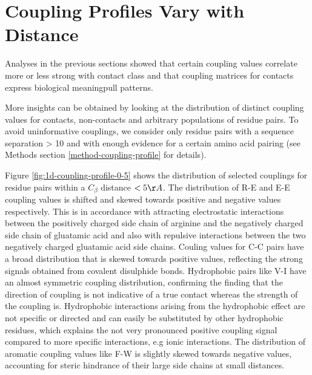 \documentclass[12pt,a4paper,twoside]{book}
\newcommand{\Cb}{C_\beta}
\theoremstyle{definition}
\theoremstyle{definition}
\theoremstyle{remark}
\begin{document}
\section{Coupling Profiles Vary with
Distance}\label{coupling-profiles-vary-with-distance}

Analyses in the previous sections showed that certain coupling values
correlate more or less strong with contact class and that coupling
matrices for contacts express biological meaningpull patterns.

More insights can be obtained by looking at the distribution of distinct
coupling values for contacts, non-contacts and arbitrary populations of
residue pairs. To avoid uninformative couplings, we consider only
residue pairs with a sequence separation \textgreater{} 10 and with
enough evidence for a certain amino acid pairing (see Methods section
\ref{method-coupling-profile} for details).

Figure \ref{fig:1d-coupling-profile-0-5} shows the distribution of
selected couplings for residue pairs within a \(\Cb\) distance
\(< 5\AA\). The distribution of R-E and E-E coupling values is shifted
and skewed towards positive and negative values respectively. This is in
accordance with attracting electrostatic interactions between the
positively charged side chain of arginine and the negatively charged
side chain of gluatamic acid and also with repulsive interactions
between the two negatively charged gluatamic acid side chains. Couling
values for C-C pairs have a broad distribution that is skewed towards
positive values, reflecting the strong signals obtained from covalent
disulphide bonds. Hydrophobic pairs like V-I have an almost symmetric
coupling distribution, confirming the finding that the direction of
coupling is not indicative of a true contact whereas the strength of the
coupling is. Hydrophobic interactions arising from the hydrophobic
effect are not specific or directed and can easily be substituted by
other hydrophobic residues, which explains the not very pronounced
positive coupling signal compared to more specific interactions, e.g
ionic interactions. The distribution of aromatic coupling values like
F-W is slightly skewed towards negative values, accounting for steric
hindrance of their large side chains at small distances.
\end{document}
